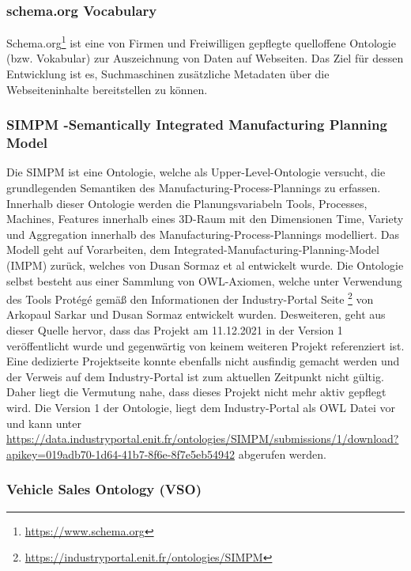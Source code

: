 \documentclass{article}
\begin{document}
\subsubsection{schema.org Vocabulary}

Schema.org\footnote{\url{https://www.schema.org}} ist eine von Firmen und Freiwilligen gepflegte quelloffene Ontologie (bzw. Vokabular) zur Auszeichnung von Daten auf Webseiten.
Das Ziel für dessen Entwicklung ist es, Suchmaschinen zusätzliche Metadaten über die Webseiteninhalte bereitstellen zu können.


\subsubsection{SIMPM -Semantically Integrated Manufacturing Planning Model}
Die SIMPM ist eine Ontologie, welche als Upper-Level-Ontologie versucht, die grundlegenden Semantiken des 
Manufacturing-Process-Plannings zu erfassen. Innerhalb dieser Ontologie werden die Planungsvariabeln Tools, Processes, Machines, Features innerhalb eines 3D-Raum mit den Dimensionen Time, Variety und Aggregation innerhalb des Manufacturing-Process-Plannings modelliert\cite{sormaz2019simpm}. Das Modell geht auf Vorarbeiten, dem Integrated-Manufacturing-Planning-Model (IMPM) zurück, welches von Dusan Sormaz et al entwickelt wurde. 
Die Ontologie selbst besteht aus einer Sammlung von OWL-Axiomen, welche unter Verwendung des Tools Protégé \cite{protegeStanford} gemäß den Informationen der Industry-Portal Seite \footnote{\url{https://industryportal.enit.fr/ontologies/SIMPM}} von Arkopaul Sarkar und Dusan Sormaz entwickelt wurden. Desweiteren, geht aus dieser Quelle hervor, dass das Projekt am 11.12.2021 in der Version 1 veröffentlicht wurde und gegenwärtig von keinem weiteren Projekt referenziert ist. Eine dedizierte Projektseite konnte ebenfalls nicht ausfindig gemacht werden und der Verweis auf dem Industry-Portal ist zum aktuellen Zeitpunkt nicht gültig. Daher liegt die Vermutung nahe, dass dieses Projekt nicht mehr aktiv gepflegt wird.
Die Version 1 der Ontologie, liegt dem Industry-Portal als OWL Datei vor und kann unter \url{https://data.industryportal.enit.fr/ontologies/SIMPM/submissions/1/download?apikey=019adb70-1d64-41b7-8f6e-8f7e5eb54942} abgerufen werden.

\subsubsection{Vehicle Sales Ontology (VSO)}
\end{document}
